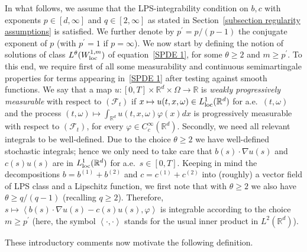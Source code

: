 \documentclass[a4paper,10pt]{article}
\newcommand\1{\mathbbm{1}}
\newcommand\loc{{\rm loc}}
\numberwithin{equation}{section}
\begin{document}
In what follows, we assume that the LPS-integrability condition on $b,c$ with exponents $p \in [d,\infty]$ and $q \in [2,\infty]$ as stated in Section~\ref{subsection regularity assumptions} is satisfied. We further denote by $p^{\prime}=p/(p-1)$ the conjugate exponent of $p$ (with $p^{\prime}=1$ if $p=\infty$). We now start by defining the notion of solutions of class $L^{\theta}(W_{\loc}^{1,m})$ of equation~\eqref{SPDE 1}, for some  $\theta\geq2$ and $m\geq p^{\prime}$. To this end, we require first of all some measurability and continuous semimartingale properties for terms appearing in~\eqref{SPDE 1} after testing against smooth functions. We say that a map $u \colon [0,T] \times \mathbb{R}^{d} \times \Omega \rightarrow \mathbb{R}$ is \emph{weakly progressively measurable} with respect to $(\mathcal{F}_{t})$ if $x\mapsto u(t,x,\omega)  \in L_{\loc}^{1}(\mathbb{R}^{d})$ for a.e.~$(t,\omega)$ and the process $(t,\omega)  \mapsto \int_{\mathbb{R}^{d}} u(t,x,\omega) \varphi(x) dx$ is progressively measurable with respect to $(\mathcal{F}_{t})$, for every $\varphi\in C_{c}^{\infty}(\mathbb{R}^{d})$. Secondly, we need all relevant integrals to be well-defined. Due to the choice $\theta\geq2$ we have well-defined stochastic integrals; hence we only need to take care that $b(s) \cdot\nabla u(s)$ and $c(s) u(s)$ are in $L_{\loc}^{1}(\mathbb{R}^{d})$ for a.e.~$s \in [0,T]$. Keeping in mind the decompositions $b = b^{(1)} + b^{(2)}$ and $c = c^{(1)} + c^{(2)}$ into (roughly) a vector field of LPS class and a Lipschitz function, we first note that with $\theta\geq2$ we also have $\theta\geq q/(q-1)$ (recalling $q\geq2$). Therefore, $s\mapsto\left\langle b(s) \cdot\nabla u(s)-c(s)  u(s) ,\varphi\right\rangle $ is integrable according to the choice $m\geq p^{\prime}$ (here, the symbol $\left\langle \cdot,\cdot\right\rangle$ stands for the usual inner product in $L^{2}(\mathbb{R}^{d})$).

These introductory comments now motivate the following definition. 
\end{document}
